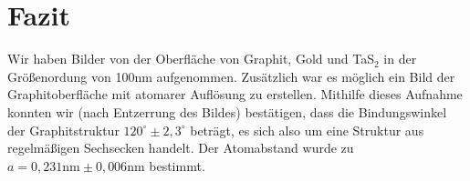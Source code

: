 \section{Fazit}
Wir haben Bilder von der Oberfläche von Graphit, Gold und TaS$_2$ in der Größenordung von 100nm aufgenommen. Zusätzlich war es möglich ein Bild der Graphitoberfläche mit atomarer Auflösung zu erstellen. Mithilfe dieses Aufnahme konnten wir (nach Entzerrung des Bildes) bestätigen, dass die Bindungswinkel der Graphitstruktur $120^\circ \pm 2,3^\circ$ beträgt, es sich also um eine Struktur aus regelmäßigen Sechsecken handelt. Der Atomabstand wurde zu $a = 0,231\si{\nano\metre} \pm 0,006\si{\nano\metre}$ bestimmt.    